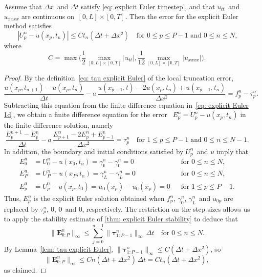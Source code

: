 \begin{theorem}\label{thm: explicit Euler error}
Assume that $\Delta x$~and $\Delta t$ satisfy 
\eqref{eq: explicit Euler timestep}, and that $u_{tt}$~and $u_{xxxx}$ are 
continuous on~$[0,L]\times[0,T]$. Then the error for the explicit Euler method 
satisfies
\[
|U^n_p-u(x_p,t_n)|\le Ct_n(\Delta t+\Delta x^2)
\quad\text{for $0\le p\le P-1$ and $0\le n\le N$,}
\]
where
\begin{equation}\label{eq: error const explicit Euler}
C=\max\biggl(\frac{1}{2}\max_{[0,L]\times[0,T]}|u_{tt}|,
	\frac{1}{12}\max_{[0,L]\times[0,T]}|u_{xxxx}|\biggr).
\end{equation}
\end{theorem}
\begin{proof}
By the definition~\eqref{eq: tau explicit Euler} of the local truncation error,
\[
\frac{u(x_p,t_{n+1})-u(x_p,t_n)}{\Delta t}
	-a\,\frac{u(x_{p+1},t)-2u(x_p,t_n)+u(x_{p-1},t_n)}{\Delta x^2}
	=f^n_p-\tau^n_p.
\]
Subtracting this equation from the finite difference equation 
in~\eqref{eq: explicit Euler 1d}, we obtain a finite difference equation for
the error ~$E^n_p=U^n_p-u(x_p,t_n)$ in the finite difference solution, namely
\[
\frac{E^{n+1}_p-E^n_p}{\Delta t}
	-a\,\frac{E^n_{p+1}-2E^n_p+E^n_{p-1}}{\Delta x^2}=\tau^n_p
\quad\text{for $1\le p\le P-1$ and $0\le n\le N-1$.}
\]
In addition, the boundary and initial conditions satisfied by $U^n_p$~and $u$ 
imply that
\[
\begin{aligned}
E^n_0&=U^n_0-u(x_0,t_n)=\gamma_0^n-\gamma_0^n=0&&\text{for $0\le n\le N$,}\\
E^n_P&=U^n_P-u(x_P,t_n)=\gamma_L^n-\gamma_L^n=0&&\text{for $0\le n\le N$,}\\
E^0_p&=U^0_p-u(x_p,t_0)=u_0(x_p)-u_0(x_p)=0&&\text{for $1\le p\le P-1$.}
\end{aligned}
\]
Thus, $E^n_p$ is the explicit Euler solution obtained when $f^n_p$, 
$\gamma_0^n$, $\gamma_L^n$~and $u_{0p}$ are replaced by $\tau^n_p$, $0$, 
$0$~and $0$, respectively.  The restriction on the step sizes allows us to apply 
the stability estimate of \cref{thm: explicit Euler stability} to deduce 
that
\[
\|\boldsymbol{E}^n_{0:P}\|_\infty
	\le\sum_{j=0}^{n-1}\|\boldsymbol{\tau}^n_{1:P-1}\|_\infty\,\Delta t
	\quad\text{for $0\le n\le N$.}
\]
By Lemma~\ref{lem: tau explicit Euler}, 
$\|\boldsymbol{\tau}^n_{1:P-1}\|_\infty\le C(\Delta t+\Delta x^2)$, so
\[
\|\boldsymbol{E}^n_{0:P}\|_\infty\le Cn(\Delta t+\Delta x^2)\,\Delta t
	=Ct_n(\Delta t+\Delta x^2),
\]
as claimed.
\end{proof}

